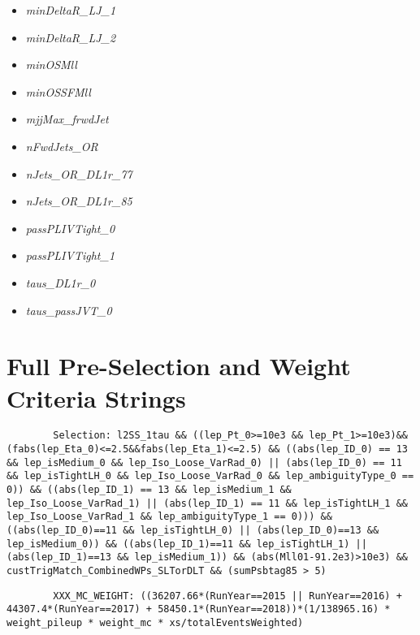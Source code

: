 \begin{multicols}{2}
\begin{itemize}
        \item \textit{minDeltaR\_LJ\_1}
        \item \textit{minDeltaR\_LJ\_2}
        \item \textit{minOSMll}
        \item \textit{minOSSFMll}
        \item \textit{mjjMax\_frwdJet}
        \item \textit{nFwdJets\_OR}
        \item \textit{nJets\_OR\_DL1r\_77}
        \item \textit{nJets\_OR\_DL1r\_85}
        \item \textit{passPLIVTight\_0}
        \item \textit{passPLIVTight\_1}
        \item \textit{taus\_DL1r\_0}
        \item \textit{taus\_passJVT\_0}
    \end{itemize}
    \end{multicols}




\section{Full Pre-Selection and Weight Criteria Strings}\label{fullSelectionAndWeightStrings}
    \begin{verbatim}
        Selection: l2SS_1tau && ((lep_Pt_0>=10e3 && lep_Pt_1>=10e3)&&(fabs(lep_Eta_0)<=2.5&&fabs(lep_Eta_1)<=2.5) && ((abs(lep_ID_0) == 13 && lep_isMedium_0 && lep_Iso_Loose_VarRad_0) || (abs(lep_ID_0) == 11 && lep_isTightLH_0 && lep_Iso_Loose_VarRad_0 && lep_ambiguityType_0 == 0)) && ((abs(lep_ID_1) == 13 && lep_isMedium_1 && lep_Iso_Loose_VarRad_1) || (abs(lep_ID_1) == 11 && lep_isTightLH_1 && lep_Iso_Loose_VarRad_1 && lep_ambiguityType_1 == 0))) && ((abs(lep_ID_0)==11 && lep_isTightLH_0) || (abs(lep_ID_0)==13 && lep_isMedium_0)) && ((abs(lep_ID_1)==11 && lep_isTightLH_1) || (abs(lep_ID_1)==13 && lep_isMedium_1)) && (abs(Mll01-91.2e3)>10e3) && custTrigMatch_CombinedWPs_SLTorDLT && (sumPsbtag85 > 5)
    \end{verbatim}

    \begin{verbatim}
        XXX_MC_WEIGHT: ((36207.66*(RunYear==2015 || RunYear==2016) + 44307.4*(RunYear==2017) + 58450.1*(RunYear==2018))*(1/138965.16) * weight_pileup * weight_mc * xs/totalEventsWeighted)
    \end{verbatim}
